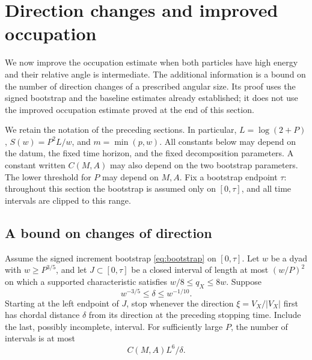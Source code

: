 \section{Direction changes and improved occupation}
\label{ang:section}

We now improve the occupation estimate when both particles have high energy
and their relative angle is intermediate. The additional information is a
bound on the number of direction changes of a prescribed angular size.
Its proof uses the signed bootstrap and the baseline estimates already
established; it does not use the improved occupation estimate proved at
the end of this section.

We retain the notation of the preceding sections. In particular,
$L=\log(2+P)$, $S(w)=P^2L/w$, and $m=\min(p,w)$. All constants below may
depend on the datum, the fixed time horizon, and the fixed decomposition
parameters. A constant written $C(M,A)$ may also depend on the two bootstrap
parameters. The lower threshold for $P$ may depend on $M,A$.
Fix a bootstrap endpoint $\tau$: throughout this section the bootstrap is
assumed only on $[0,\tau]$, and all time intervals are clipped to this range.

\subsection{A bound on changes of direction}

\begin{lemma}\label{ang:direction}
Assume the signed increment bootstrap \eqref{eq:bootstrap} on $[0,\tau]$.
Let $w$ be a dyad with $w\ge P^{3/5}$, and let $J\subset[0,\tau]$ be a closed
interval of length at most $(w/P)^2$ on which a supported characteristic
satisfies $w/8\le q_X\le8w$. Suppose
\[
 w^{-3/5}\le\delta\le w^{-1/10}.
\]
Starting at the left endpoint of $J$, stop whenever the direction
$\xi=V_X/|V_X|$ first has chordal distance $\delta$ from its direction at
the preceding stopping time. Include the last, possibly incomplete,
interval. For sufficiently large $P$, the number of intervals is at most
\begin{equation}\label{ang:count}
 C(M,A)L^6/\delta.
\end{equation}
\end{lemma}

